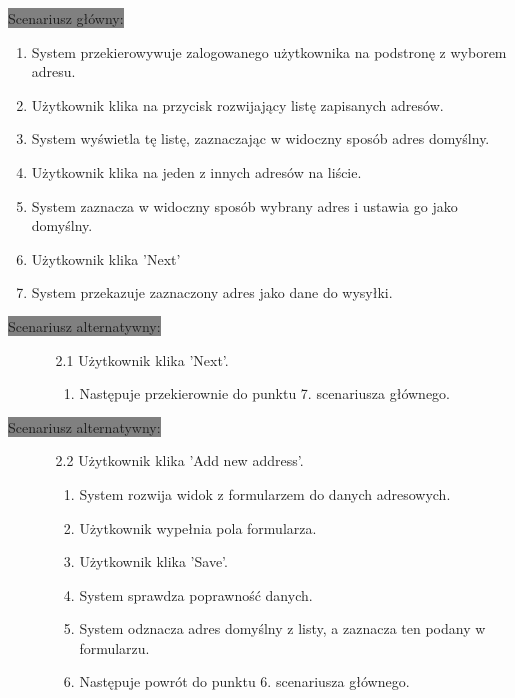 \documentclass[12pt]{report}
\begin{document}
			\colorbox{grey}{Scenariusz główny:}
			\begin{enumerate}
				\item System przekierowywuje zalogowanego użytkownika na podstronę z wyborem adresu.
				\item Użytkownik klika na przycisk rozwijający listę zapisanych adresów.
				\item System wyświetla tę listę, zaznaczając w widoczny sposób adres domyślny.
				\item Użytkownik klika na jeden z innych adresów na liście.
				\item System zaznacza w widoczny sposób wybrany adres i ustawia go jako domyślny.
				\item Użytkownik klika 'Next'
				\item System przekazuje zaznaczony adres jako dane do wysyłki.
			\end{enumerate}
		
			\newpage
			\colorbox{grey}{Scenariusz alternatywny:}
			\begin{enumerate}\addtocounter{enumi}{2}
				\item[]
				\begin{enumerate}
					\item[2.1] Użytkownik klika 'Next'.
					\begin{enumerate}
						\item Następuje przekierownie do punktu 7. scenariusza głównego.
					\end{enumerate}
				\end{enumerate}
			\end{enumerate}

			\colorbox{grey}{Scenariusz alternatywny:}
			\begin{enumerate}\addtocounter{enumi}{2}
				\item[]
				\begin{enumerate}
					\item[2.2] Użytkownik klika 'Add new address'.
						\begin{enumerate}
							\item System rozwija widok z formularzem do danych adresowych.
							\item Użytkownik wypełnia pola formularza.
							\item Użytkownik klika 'Save'.
							\item System sprawdza poprawność danych.
							\item System odznacza adres domyślny z listy, a zaznacza ten podany w formularzu.
							\item Następuje powrót do punktu 6. scenariusza głównego.	
						\end{enumerate}
				\end{enumerate}
			\end{enumerate}
\end{document}
